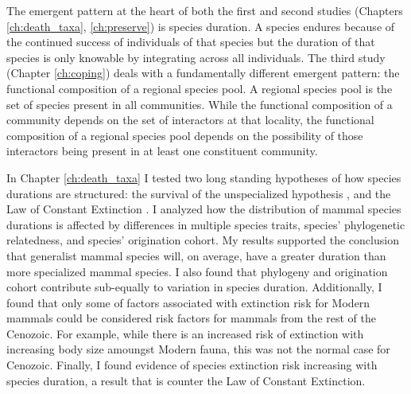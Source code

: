 The emergent pattern at the heart of both the first and second studies (Chapters \ref{ch:death_taxa}, \ref{ch:preserve}) is species duration. A species endures because of the continued success of individuals of that species but the duration of that species is only knowable by integrating across all individuals. The third study (Chapter \ref{ch:coping}) deals with a fundamentally different emergent pattern: the functional composition of a regional species pool. A regional species pool is the set of species present in all communities. While the functional composition of a community depends on the set of interactors at that locality, the functional composition of a regional species pool depends on the possibility of those interactors being present in at least one constituent community. 

In Chapter \ref{ch:death_taxa} I tested two long standing hypotheses of how species durations are structured: the survival of the unspecialized hypothesis \citep{Simpson1944}, and the Law of Constant Extinction \citep{VanValen1973}. I analyzed how the distribution of mammal species durations is affected by differences in multiple species traits, species' phylogenetic relatedness, and species' origination cohort. My results supported the conclusion that generalist mammal species will, on average, have a greater duration than more specialized mammal species. I also found that phylogeny and origination cohort contribute sub-equally to variation in species duration. Additionally, I found that only some of factors associated with extinction risk for Modern mammals could be considered risk factors for mammals from the rest of the Cenozoic. For example, while there is an increased risk of extinction with increasing body size amoungst Modern fauna, this was not the normal case for Cenozoic. Finally, I found evidence of species extinction risk increasing with species duration, a result that is counter the Law of Constant Extinction.

